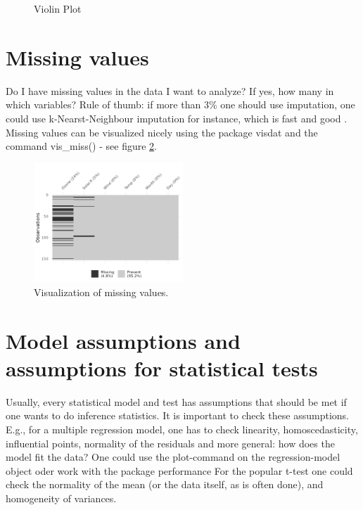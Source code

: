 \documentclass[12pt,a4paper]{article}
\begin{document}
\begin{figure}[htbp]
\begin{minipage}[b]{0.45\textwidth}
    \caption{Violin Plot}
    \label{densityplot}
  \end{minipage}
\end{figure}

\section{Missing values}
Do I have missing values in the data I want to analyze? If yes, how many in which variables?
Rule of thumb: if more than 3\% one should use imputation, one could use k-Nearst-Neighbour imputation for instance, which is fast and good \cite{VIM}.
Missing values can be visualized nicely using the package visdat \cite{visdat} and the command vis\_miss() - see figure \ref{fig:vismiss}. 

\begin{figure}[h!]
  \centering
  \includegraphics[width=0.5\textwidth]{./images/vis_miss.png}
  \caption{Visualization of missing values.}
  \label{fig:vismiss}
\end{figure}

\section{Model assumptions and assumptions for statistical tests}
Usually, every statistical model and test has assumptions that should be met if one wants to do inference statistics. It is important to check these assumptions. E.g., for a multiple regression model, one has to check linearity, homoscedasticity, influential points, normality of the residuals and more general: how does the model fit the data?
One could use the plot-command on the regression-model object oder work with the package performance 
For the popular t-test one could check the normality of the mean (or the data itself, as is often done), and homogeneity of variances.
\end{document}

